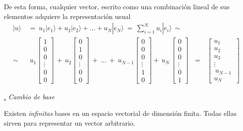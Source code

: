 \documentclass[a4paper,11pt]{book} %
\numberwithin{equation}{chapter}
\def\subsubiContadorIt{\par\addtocounter{subsubsection}{1}\underline{\it\thesubsubsection.}\hskip0.5cm \setcounter{subsubsubsectionIt}{0}}
\newcommand{\SubsubiIt}[1]{
		\subsubiContadorIt \textit{#1}
	}
\newcounter{subsubsubsectionIt}[subsubsection]
\begin{document}
De esta forma, cualquier vector, escrito como una combinación lineal de sus elementos adquiere la representación usual
	\begin{equation}
	\begin{aligned}
	|u\rangle ~&=~ {u_1} |e_1 \rangle + {u_2} | e_2\rangle +... + {u_{ N}}|e_{ N}\rangle~=~ \sum_{i=1}^N {u_ i} |e_i\rangle \,\sim \\
	\sim &~ {u_1} \begin{bmatrix} 1 \\ 0 \\ 0\\ \vdots 
\\ 0 \\ 0 \end{bmatrix} \,+\,{u_2} \begin{bmatrix} 0 \\ 1 \\ 0\\ \vdots \\ 0 \\ 0 \end{bmatrix}~+~ ... ~+ ~
{u_{N-1}} \begin{bmatrix} 0 \\ 0 \\ 0\\\vdots 
\\ 1 \\ 0 \end{bmatrix}+ 
\,{u_N}\,  \begin{bmatrix} 0 \\ 0 \\0\\ \vdots 
\\ 0 \\ 1 \end{bmatrix}~~~= ~~~
  \begin{bmatrix} {u_1} \\ {u_2} \\{u_3}\\ \vdots 
\\ \,{u_{N-1}}\, \\ {u_{N}} \end{bmatrix}
	\end{aligned}
	\end{equation}

		
			\SubsubiIt{Cambio de base}

Existen \textit{infinitas} bases  en un espacio vectorial de dimensión finita.
Todas ellas sirven para representar un vector arbitrario.
\end{document}
